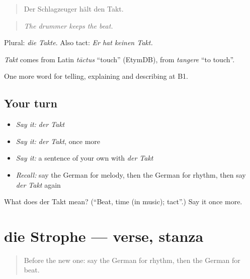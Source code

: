 \begin{quote}
Der Schlagzeuger hält den Takt.
\end{quote}

\begin{quote}
\emph{The drummer keeps the beat.}
\end{quote}

Plural: \emph{die Takte}. Also tact: \emph{Er hat keinen Takt.}

\begin{cousinweb}
\emph{Takt} comes from Latin \emph{tāctus} \textquotedblleft{}touch\textquotedblright{} (EtymDB), from \emph{tangere} \textquotedblleft{}to touch\textquotedblright{}.
\end{cousinweb}

\begin{grammarlens}[title={What you've built}]
One more word for telling, explaining and describing at B1.
\end{grammarlens}

\subsection*{Your turn}
\begin{itemize}
\raggedright
  \item \emph{Say it:} \emph{der Takt}
  \item \emph{Say it:} \emph{der Takt}, once more
  \item \emph{Say it:} a sentence of your own with \emph{der Takt}
  \item \emph{Recall:} say the German for melody, then the German for rhythm, then say \emph{der Takt} again
\end{itemize}

\begin{tcolorbox}[breakable,colback=teal!4,colframe=teal!35!black,title={Before you move on}]
What does der Takt mean? (\textquotedblleft{}Beat, time (in music); tact\textquotedblright{}.) Say it once more.
\end{tcolorbox}
\section[die Strophe]{die Strophe — verse, stanza}

\label{lesson:GE-C514-strophe}



\begin{quote}
Before the new one: say the German for rhythm, then the German for beat.
\end{quote}

